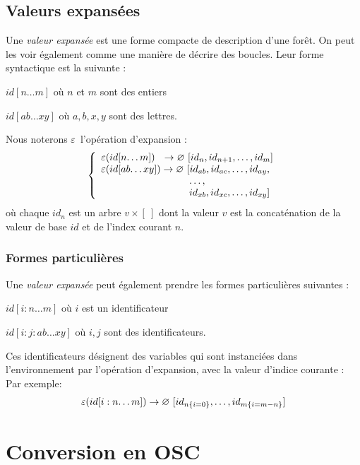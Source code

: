 \documentclass{article}
\newcommand{\forest}	{\ensuremath{\varnothing}}
\newcommand{\etc}		{\ensuremath{\text{…}}}
\newcommand{\emptyf}	{\ensuremath{[\ ]}}
\newcommand{\nexpand}	{\ensuremath{\varepsilon}}
\newcommand{\ulb}		{\hspace*{31.5mm}}
\begin{document}
\subsection{Valeurs expansées}

Une \emph{valeur expansée} est une forme compacte de description d'une forêt. On peut les voir également comme une manière de décrire des boucles. Leur forme syntactique est la suivante :
\begin{description}
\item $id[n…m]$ 	où $n$ et $m$ sont des entiers
\item $id[ab…xy]$ où $a,b,x,y$ sont des lettres.
\end{description}
Nous noterons \nexpand\ l'opération d'expansion :
\[
\left\{
\begin{array}{l}
	\nexpand(id[n\etc m])   \ \ \to \forest \ [id_n,id_{n+1},\etc ,id_m] \\
	\nexpand(id[ab\etc xy]) \to \forest \ [id_{ab},id_{ac},\etc ,id_{ay}, \\
	\ulb \etc ,\\
	\ulb id_{xb},id_{xc},\etc ,id_{xy}]
\end{array}
\right.
\]
où chaque $id_n$ est un arbre $v \times \emptyf$ dont la valeur $v$ est la concaténation de la valeur de base $id$ et de l'index courant $n$.

\subsubsection{Formes particulières}

Une \emph{valeur expansée} peut également prendre les formes particulières suivantes : 
\begin{description}
\item $id[i:n…m]$ 	où $i$ est un identificateur
\item $id[i:j:ab…xy]$ où $i,j$ sont des identificateurs.
\end{description}
Ces identificateurs désignent des variables qui sont instanciées dans l'environnement par l'opération d'expansion, avec la valeur d'indice courante :
Par exemple:
\[
	\nexpand(id[i:n\etc m]) \to \forest \ [id_{n\{i=0\}},\etc ,id_{m\{i=m-n\}}] \\
\]


\section{Conversion en OSC}\label{ssec:slash}
\end{document}
